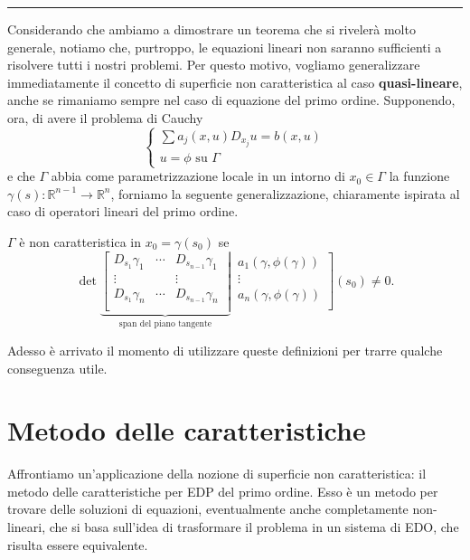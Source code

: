 \noindent\rule[0.5ex]{\linewidth}{0.2pt}
Considerando che ambiamo a dimostrare un teorema che si rivelerà molto generale, notiamo che, purtroppo, le equazioni lineari non saranno sufficienti a risolvere tutti i nostri problemi. Per questo motivo, vogliamo generalizzare immediatamente il concetto di superficie non caratteristica al caso \textbf{quasi-lineare}, anche se rimaniamo sempre nel caso di equazione del primo ordine. Supponendo, ora, di avere il problema di Cauchy
\begin{equation}
\begin{cases}
\sum a_j(x,u)D_{x_j} u = b(x,u)\\
u = \phi \text{ su } \Gamma
\end{cases}
\end{equation}
e che $\Gamma$ abbia come parametrizzazione locale in un intorno di $x_0\in \Gamma$ la funzione $\gamma (s): \mathbb{R}^{n-1}\rightarrow \mathbb{R}^n$, forniamo la seguente generalizzazione, chiaramente ispirata al caso di operatori lineari del primo ordine.
\begin{definition}
$\Gamma$ è non caratteristica in $x_0=\gamma (s_0)$ se\\
\begin{equation*}
\det
\underbrace{
\left[
\begin{matrix}
D_{s_1}\gamma_1 & \cdots & D_{s_{n-1}}\gamma_1 \\
\vdots &  & \vdots \\
D_{s_1}\gamma_n & \cdots & D_{s_{n-1}}\gamma_n \\
\end{matrix}\;\right|}_{\text{span del piano tangente}} \,
\left.
\begin{matrix}
a_1(\gamma, \phi(\gamma))\\
\vdots\\
a_n(\gamma, \phi(\gamma))\\
\end{matrix}\right] (s_0) \neq 0.
\end{equation*}
\end{definition}
Adesso è arrivato il momento di utilizzare queste definizioni per trarre qualche conseguenza utile.

\newpage
\section{Metodo delle caratteristiche}\label{metodocar}
Affrontiamo un'applicazione della nozione di superficie non caratteristica: il metodo delle caratteristiche per EDP del primo ordine. 
Esso è un metodo per trovare delle soluzioni di equazioni, eventualmente anche completamente non-lineari, che si basa sull'idea di trasformare il problema in un sistema di EDO, che risulta essere equivalente. 

